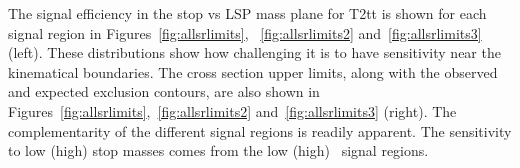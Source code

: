
The signal efficiency in the stop vs LSP mass plane for T2tt is shown 
for each signal region in Figures~\ref{fig:allsrlimits},
~\ref{fig:allsrlimits2} and~\ref{fig:allsrlimits3} (left). These distributions show how
challenging it is to have sensitivity near the kinematical boundaries.
The cross section upper limits, along with the
observed and expected exclusion contours, are also shown in
Figures~\ref{fig:allsrlimits},~\ref{fig:allsrlimits2} and~\ref{fig:allsrlimits3} (right).
The complementarity of the different signal regions is readily apparent.  
The sensitivity to low (high) stop masses comes from the 
low (high) \met\ signal regions.

